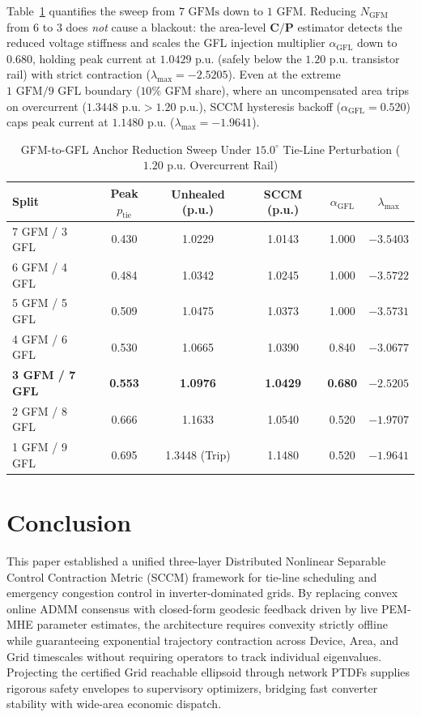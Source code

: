 \documentclass[journal]{IEEEtran}
\begin{document}
Table~\ref{tab:gfm_sweep} quantifies the sweep from $7\text{ GFMs}$ down to $1\text{ GFM}$. Reducing $N_{\text{GFM}}$ from $6$ to $3$ does \emph{not} cause a blackout: the area-level $\mathbf{C}/\mathbf{P}$ estimator detects the reduced voltage stiffness and scales the GFL injection multiplier $\alpha_{\text{GFL}}$ down to $0.680$, holding peak current at $1.0429\text{ p.u.}$ (safely below the $1.20\text{ p.u.}$ transistor rail) with strict contraction ($\lambda_{\max} = -2.5205$). Even at the extreme $1\text{ GFM} / 9\text{ GFL}$ boundary ($10\%$ GFM share), where an uncompensated area trips on overcurrent ($1.3448\text{ p.u.} > 1.20\text{ p.u.}$), SCCM hysteresis backoff ($\alpha_{\text{GFL}} = 0.520$) caps peak current at $1.1480\text{ p.u.}$ ($\lambda_{\max} = -1.9641$).

\begin{table}[!t]
\centering
\caption{GFM-to-GFL Anchor Reduction Sweep Under $15.0^\circ$ Tie-Line Perturbation ($1.20\text{ p.u.}$ Overcurrent Rail)}
\label{tab:gfm_sweep}
\scriptsize
\setlength{\tabcolsep}{3.2pt}
\renewcommand{\arraystretch}{1.15}
\begin{tabular}{@{}lccccc@{}}
\toprule
\textbf{Split} & \textbf{Peak $p_{\text{tie}}$} & \textbf{Unhealed (p.u.)} & \textbf{SCCM (p.u.)} & $\alpha_{\text{GFL}}$ & $\lambda_{\max}$ \\
\midrule
7 GFM / 3 GFL & 0.430 & 1.0229 & 1.0143 & 1.000 & $-3.5403$ \\
6 GFM / 4 GFL & 0.484 & 1.0342 & 1.0245 & 1.000 & $-3.5722$ \\
5 GFM / 5 GFL & 0.509 & 1.0475 & 1.0373 & 1.000 & $-3.5731$ \\
4 GFM / 6 GFL & 0.530 & 1.0665 & 1.0390 & 0.840 & $-3.0677$ \\
\textbf{3 GFM / 7 GFL} & \textbf{0.553} & \textbf{1.0976} & \textbf{1.0429} & \textbf{0.680} & $\mathbf{-2.5205}$ \\
2 GFM / 8 GFL & 0.666 & 1.1633 & 1.0540 & 0.520 & $-1.9707$ \\
1 GFM / 9 GFL & 0.695 & 1.3448 (Trip) & 1.1480 & 0.520 & $-1.9641$ \\
\bottomrule
\end{tabular}
\end{table}

\section{Conclusion}
This paper established a unified three-layer Distributed Nonlinear Separable Control Contraction Metric (SCCM) framework for tie-line scheduling and emergency congestion control in inverter-dominated grids. By replacing convex online ADMM consensus with closed-form geodesic feedback driven by live PEM-MHE parameter estimates, the architecture requires convexity strictly offline while guaranteeing exponential trajectory contraction across Device, Area, and Grid timescales without requiring operators to track individual eigenvalues. Projecting the certified Grid reachable ellipsoid through network PTDFs supplies rigorous safety envelopes to supervisory optimizers, bridging fast converter stability with wide-area economic dispatch.
\end{document}
